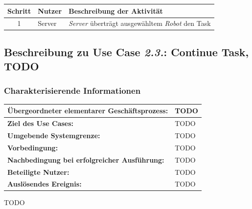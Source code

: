 				\begin{table}[H]
					\centering
					\begin{tabularx}{\textwidth}{|c|p{2cm}|X|}
						\hline
						Schritt & Nutzer & Beschreibung der Aktivität \\ \hline
						1 & Server & \emph{Server} überträgt ausgewähltem \emph{Robot} den Task \\
						\hline
					\end{tabularx}
				\end{table}
				
				
				\pagebreak
				
				
			\subsection*{Beschreibung zu Use Case \emph{2.3.}: Continue Task, TODO}
			
			\subsubsection*{Charakterisierende Informationen}
			
			\begin{table}[H]
				\centering
				\begin{tabularx}{\textwidth}{|p{5cm}|X|}
					\hline
					\textbf{Übergeordneter elementarer Geschäftsprozess:} & TODO  \\ \hline
					\textbf{Ziel des Use Cases:} & TODO \\ \hline
					\textbf{Umgebende Systemgrenze:} & TODO \\ \hline
					\textbf{Vorbedingung:} & TODO \\ \hline
					\textbf{Nachbedingung bei erfolgreicher Ausführung:} & TODO \\ \hline
					\textbf{Beteiligte Nutzer:} & TODO \\ \hline
					\textbf{Auslösendes Ereignis:} & TODO \\
					\hline
				\end{tabularx}
			\end{table}
			
			TODO
			
			
			\pagebreak